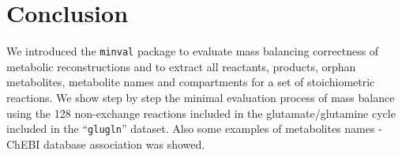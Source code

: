 \section{Conclusion}
We introduced the \texttt{minval} package to evaluate mass balancing correctness of metabolic reconstructions and to extract all reactants, products, orphan metabolites, metabolite names and compartments for a set of stoichiometric reactions. We show step by step the minimal evaluation process of mass balance using the 128 non-exchange reactions included in the glutamate/glutamine cycle included in the ``\texttt{glugln}'' dataset. Also some examples of metabolites names - ChEBI database association was showed.